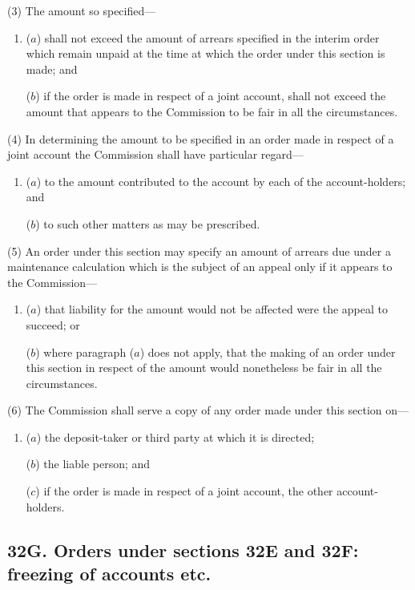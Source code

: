 \documentclass[12pt,a4paper]{article}
\begin{document}
(3) The amount so specified---
\begin{enumerate}\item[]
($a$) shall not exceed the amount of arrears specified in the interim order which remain unpaid at the time at which the order under this section is made; and

($b$) if the order is made in respect of a joint account, shall not exceed the amount that appears to the Commission to be fair in all the circumstances.
\end{enumerate}

(4)
In determining the amount to be specified in an order made in respect of a joint account the Commission shall have particular regard---
\begin{enumerate}\item[]
($a$) to the amount contributed to the account by each of the account-holders; and

($b$) to such other matters as may be prescribed.
\end{enumerate}

(5)
An order under this section may specify an amount of arrears due under a maintenance calculation which is the subject of an appeal only if it appears to the Commission---
\begin{enumerate}\item[]
($a$) that liability for the amount would not be affected were the appeal to succeed; or

($b$) where paragraph ($a$) does not apply, that the making of an order under this section in respect of the amount would nonetheless be fair in all the circumstances.
\end{enumerate}

(6) The Commission shall serve a copy of any order made under this section on---
\begin{enumerate}\item[]
($a$) the deposit-taker or third party at which it is directed;

($b$) the liable person; and

($c$) if the order is made in respect of a joint account, the other account-holders.
\end{enumerate}

\subsection{32G. Orders under sections 32E and 32F: freezing of accounts etc.}
\end{document}
